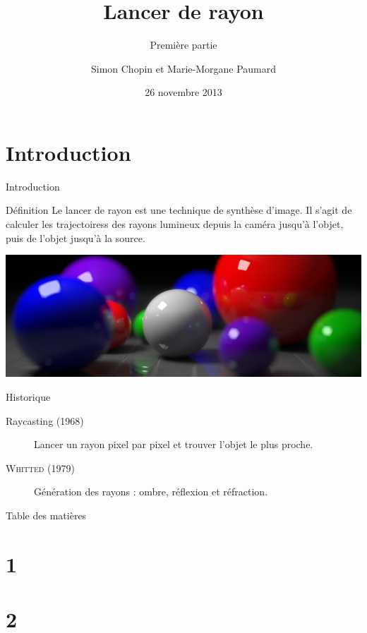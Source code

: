 \documentclass{beamer}
\title{Lancer de rayon}
\subtitle{Première partie}
\author{Simon Chopin et Marie-Morgane Paumard}
\date{26 novembre 2013}
\begin{document}
\begin{frame}
	\titlepage
\end{frame}

\section{Introduction}

\begin{frame}{Introduction}
\begin{alertblock}{Définition}
Le lancer de rayon est une technique de synthèse d'image. Il s'agit de calculer
les trajectoiress des rayons lumineux depuis la caméra jusqu'à l'objet, puis de
l'objet jusqu'à la source.
\end{alertblock}

\begin{center}
  \includegraphics[scale=0.2]{img/intro.jpg}
\end{center}

\begin{block}{Historique}
  \begin{description}
    \item[Raycasting (1968)] Lancer un rayon pixel par pixel et trouver l'objet
le plus proche.
    \item[\textsc{Whitted} (1979)] Génération des rayons : ombre, réflexion et
réfraction.
  \end{description}
\end{block}

\end{frame}

\begin{frame}{Table des matières}
	\tableofcontents
\end{frame}

\section{1}

\section{2}
\end{document}
